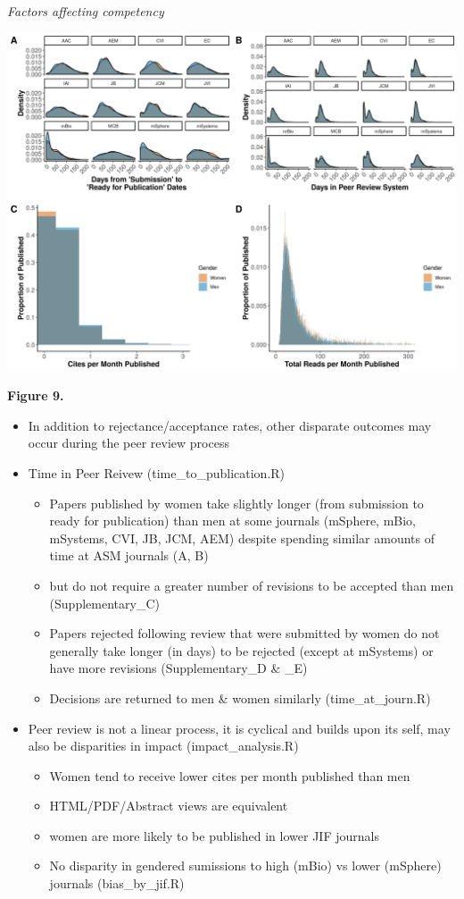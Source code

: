 \documentclass[11pt,]{article}
\providecommand{\tightlist}{%
  \setlength{\itemsep}{0pt}\setlength{\parskip}{0pt}}
\begin{document}
\emph{Factors affecting competency}

\includegraphics{Figure_9.png}

\textbf{Figure 9.}

\begin{itemize}
\tightlist
\item
  In addition to rejectance/acceptance rates, other disparate outcomes
  may occur during the peer review process
\item
  Time in Peer Reivew (time\_to\_publication.R)

  \begin{itemize}
  \tightlist
  \item
    Papers published by women take slightly longer (from submission to
    ready for publication) than men at some journals (mSphere, mBio,
    mSystems, CVI, JB, JCM, AEM) despite spending similar amounts of
    time at ASM journals (A, B)
  \item
    but do not require a greater number of revisions to be accepted than
    men (Supplementary\_C)
  \item
    Papers rejected following review that were submitted by women do not
    generally take longer (in days) to be rejected (except at mSystems)
    or have more revisions (Supplementary\_D \& \_E)
  \item
    Decisions are returned to men \& women similarly (time\_at\_journ.R)
  \end{itemize}
\item
  Peer review is not a linear process, it is cyclical and builds upon
  its self, may also be disparities in impact (impact\_analysis.R)

  \begin{itemize}
  \tightlist
  \item
    Women tend to receive lower cites per month published than men
  \item
    HTML/PDF/Abstract views are equivalent
  \item
    women are more likely to be published in lower JIF journals
  \item
    No disparity in gendered sumissions to high (mBio) vs lower
    (mSphere) journals (bias\_by\_jif.R)
  \end{itemize}
\end{itemize}
\end{document}
